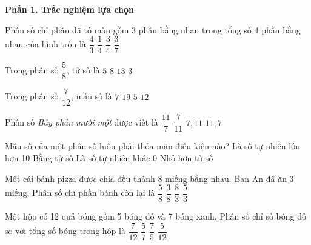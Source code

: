 \textbf{Phần 1. Trắc nghiệm lựa chọn}

\begin{ex} %
Phân số chỉ phần đã tô màu gồm 3 phần bằng nhau trong tổng số 4 phần bằng nhau của hình tròn là
\choice
{$\dfrac{4}{3}$}
{$\dfrac{1}{4}$}
{\True $\dfrac{3}{4}$}
{$\dfrac{3}{7}$}
\end{ex}

\begin{ex} %
Trong phân số $\dfrac{5}{8}$, tử số là
\choice
{\True $5$}
{$8$}
{$13$}
{$3$}
\end{ex}

\begin{ex} %
Trong phân số $\dfrac{7}{12}$, mẫu số là
\choice
{$7$}
{$19$}
{$5$}
{\True $12$}
\end{ex}

\begin{ex} %
Phân số \textit{Bảy phần mười một} được viết là
\choice
{$\dfrac{11}{7}$}
{\True $\dfrac{7}{11}$}
{$7{,}11$}
{$11{,}7$}
\end{ex}

\begin{ex} %
Mẫu số của một phân số luôn phải thỏa mãn điều kiện nào?
\choice
{Là số tự nhiên lớn hơn 10}
{Bằng tử số}
{\True Là số tự nhiên khác 0}
{Nhỏ hơn tử số}
\end{ex}

\begin{ex} %
Một cái bánh pizza được chia đều thành 8 miếng bằng nhau. Bạn An đã ăn 3 miếng. Phân số chỉ phần bánh còn lại là
\choice
{\True $\dfrac{5}{8}$}
{$\dfrac{3}{8}$}
{$\dfrac{8}{3}$}
{$\dfrac{5}{3}$}
\end{ex}

\begin{ex} %
Một hộp có 12 quả bóng gồm 5 bóng đỏ và 7 bóng xanh. Phân số chỉ số bóng đỏ so với tổng số bóng trong hộp là
\choice
{$\dfrac{7}{12}$}
{$\dfrac{5}{7}$}
{$\dfrac{7}{5}$}
{\True $\dfrac{5}{12}$}
\end{ex}

